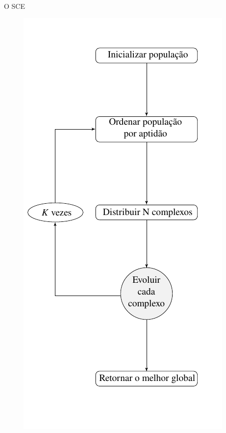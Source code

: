 \documentclass[10pt,xcolor=table,fleqn]{beamer}
\newcommand{\mytitle}[1]{
  \begin{center}
    \color{defblue}
    { \LARGE #1 }
  \end{center}
}
\begin{document}
\begin{frame}
	\mytitle{O SCE}
  \begin{figure}
    \centering
    \hspace{4mm}
    \begin{minipage}[b]{0.32\textwidth}
      \includegraphics[width=\textwidth]{../img/sce/flow1}

\end{minipage}
\end{figure}
\end{frame}
\end{document}
